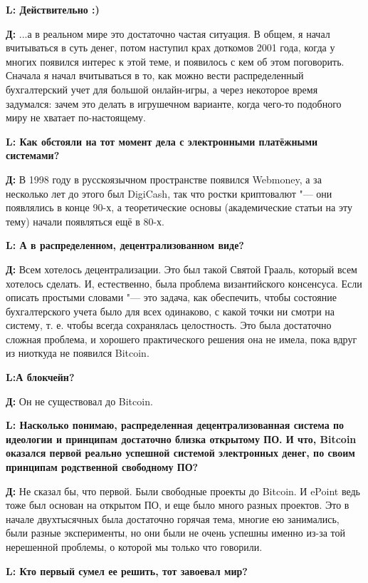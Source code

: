 \documentclass[10pt, a5paper]{article}
\begin{document}
{\noindent \bf L: Действительно :)} 

{\noindent \bf Д:} ...а в реальном мире это достаточно частая ситуация. В общем, я начал вчитываться в суть денег, потом наступил крах доткомов 2001 года, когда у многих появился интерес к этой теме, и появилось с кем об этом поговорить. Сначала я начал вчитываться в то, как можно вести распределенный бухгалтерский учет для большой онлайн-игры, а через некоторое время задумался: зачем это делать в игрушечном варианте, когда чего-то подобного миру не хватает по-настоящему. 

{\noindent \bf L: Как обстояли на тот момент дела с электронными платёжными системами?}

{\noindent \bf Д:}  В 1998 году в русскоязычном пространстве появился Webmoney, а за несколько лет до этого был DigiCash, так что ростки криптовалют "--- они появлялись в конце 90-х, а теоретические основы (академические статьи на эту тему) начали появляться ещё в 80-х.

{\noindent \bf L: А в распределенном, децентрализованном виде?}

{\noindent \bf Д:} Всем хотелось децентрализации. Это был такой Святой Грааль, который всем хотелось сделать. И, естественно, была проблема византийского консенсуса. Если описать простыми словами "--- это задача, как обеспечить, чтобы состояние бухгалтерского учета было для всех одинаково, с какой точки ни смотри на систему, т. е. чтобы всегда сохранялась целостность. Это была достаточно сложная проблема, и хорошего практического решения она не имела, пока вдруг из ниоткуда не появился Bitcoin.

{\noindent \bf L:А блокчейн?}

{\noindent \bf Д:} Он не существовал до Bitcoin. 

{\noindent \bf L: Насколько понимаю, распределенная децентрализованная система по идеологии и принципам достаточно близка открытому ПО. И что, Bitcoin оказался первой реально успешной системой электронных денег, по своим принципам родственной свободному ПО?}

{\noindent \bf Д:} Не сказал бы, что первой. Были свободные проекты до Bitcoin. И ePoint ведь тоже был основан на открытом ПО, и еще было много разных проектов. Это в начале двухтысячных была достаточно горячая тема, многие ею занимались, были разные эксперименты, но они были не очень успешны именно из-за той нерешенной проблемы, о которой мы только что говорили.

{\noindent \bf L: Кто первый сумел ее решить, тот завоевал мир?}
\end{document}
